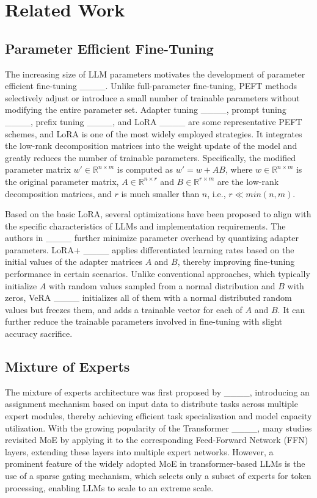 \section{Related Work}
\label{sec:relatedwork}
\subsection{Parameter Efficient Fine-Tuning}
The increasing size of LLM parameters motivates the development of parameter efficient fine-tuning ____. Unlike full-parameter fine-tuning, PEFT methods selectively adjust or introduce a small number of trainable parameters without modifying the entire parameter set. Adapter tuning ____, prompt tuning ____, prefix tuning ____, and LoRA ____ are some representative PEFT schemes, and LoRA is one of the most widely employed strategies. It integrates the low-rank decomposition matrices into the weight update of the model and greatly reduces the number of trainable parameters. Specifically, the modified parameter matrix $w'\in \mathbb{R}^{n\times m}$ is computed as $w'=w+AB$, where $w \in \mathbb{R}^{n\times m}$ is the original parameter matrix, $A\in \mathbb{R}^{n\times r}$ and $B \in \mathbb{R}^{r\times m}$ are the low-rank decomposition matrices, and $r$ is much smaller than $n$, i.e., $r\ll min(n,m)$. 

Based on the basic LoRA, several optimizations have been proposed to align with the specific characteristics of LLMs and implementation requirements. The authors in ____ further minimize parameter overhead by quantizing adapter parameters. LoRA+ ____ applies differentiated learning rates based on the initial values of the adapter matrices $A$ and $B$, thereby improving fine-tuning performance in certain scenarios. Unlike conventional approaches, which typically initialize $A$ with random values sampled from a normal distribution and $B$ with zeros, VeRA ____ initializes all of them with a normal distributed random values but freezes them, and adds a trainable vector for each of $A$ and $B$. It can further reduce the trainable parameters involved in fine-tuning with slight accuracy sacrifice.

\subsection{Mixture of Experts}
The mixture of experts architecture was first proposed by ____, introducing an assignment mechanism based on input data to distribute tasks across multiple expert modules, thereby achieving efficient task specialization and model capacity utilization. 
With the growing popularity of the Transformer ____, many studies revisited MoE by applying it to the corresponding Feed-Forward Network (FFN) layers, extending these layers into multiple expert networks. However, a prominent feature of the widely adopted MoE in transformer-based LLMs is the use of a sparse gating mechanism, which selects only a subset of experts for token processing, enabling LLMs to scale to an extreme scale. 

